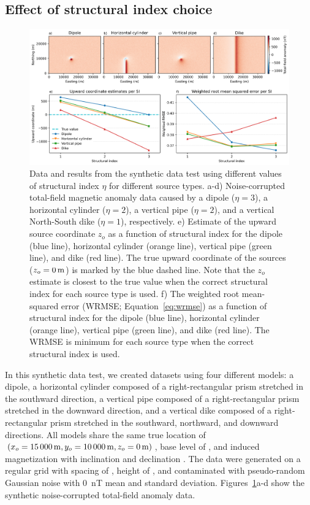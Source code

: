 \subsection{Effect of structural index choice}
\label{sec:si}

\begin{figure}[tb!]
\centering
\includegraphics[width=1\linewidth]{figures/synthetic-structural-index.png}
\caption{
    Data and results from the synthetic data test using different values of structural index $\eta$ for different source types.
    a-d) Noise-corrupted total-field magnetic anomaly data caused by a dipole ($\eta=3$), a horizontal cylinder ($\eta=2$), a vertical pipe ($\eta=2$), and a vertical North-South dike ($\eta=1$), respectively.
    e) Estimate of the upward source coordinate $z_o$ as a function of structural index for the dipole (blue line), horizontal cylinder (orange line), vertical pipe (green line), and dike (red line).
    The true upward coordinate of the sources ($z_o = \SynSITrueUp$) is marked by the blue dashed line. Note that the $z_o$ estimate is closest to the true value when the correct structural index for each source type is used.
    f) The weighted root mean-squared error (WRMSE; Equation~\ref{eq:wrmse}) as a function of structural index for the dipole (blue line), horizontal cylinder (orange line), vertical pipe (green line), and dike (red line). The WRMSE is minimum for each source type when the correct structural index is used.
}
\label{fig:si}
\end{figure}

In this synthetic data test, we created datasets using four different models: a dipole, a horizontal cylinder composed of a right-rectangular prism stretched in the southward direction, a vertical pipe composed of a right-rectangular prism stretched in the downward direction, and a vertical dike composed of a right-rectangular prism stretched in the southward, northward, and downward directions.
All models share the same true location of $(x_o=\SynSITrueEast, y_o=\SynSITrueNorth, z_o=\SynSITrueUp)$, base level of \SynSITrueBase, and induced magnetization with inclination \SynSIInc{} and declination \SynSIDec.
The data were generated on a regular grid with spacing of \SynSISpacing, height of \SynSIHeight, and contaminated with pseudo-random Gaussian noise with \qty{0}{\nano\tesla} mean and \SynSINoise{} standard deviation. Figures~\ref{fig:si}a-d show the synthetic noise-corrupted total-field anomaly data.

